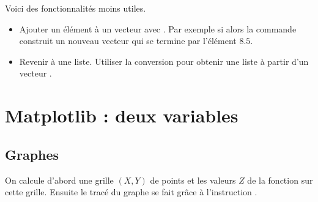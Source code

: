 \documentclass[11pt,class=report,crop=false]{standalone}
\begin{document}
\medskip

Voici des fonctionnalités moins utiles.

\begin{itemize}
  \item Ajouter un élément à un vecteur avec .
  Par exemple si  alors la commande
   construit un nouveau vecteur qui se termine par l'élément $8.5$.
  
  \item Revenir à une liste. Utiliser la conversion  pour obtenir une liste \Python{} à partir d'un vecteur \numpy{}.
  
\end{itemize}



\section{Matplotlib : deux variables}

\subsection{Graphes}

On calcule d'abord une grille $(X,Y)$ de points et les valeurs $Z$ de la fonction sur cette grille. Ensuite le tracé du graphe se fait grâce à l'instruction .
\end{document}
